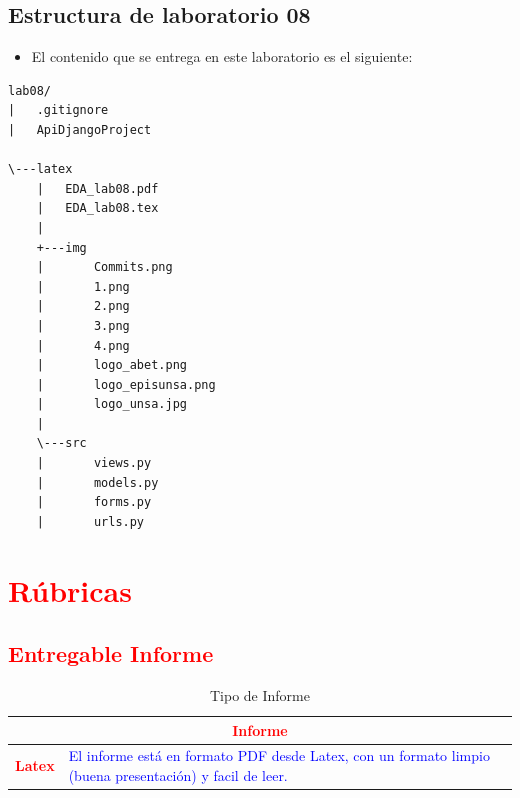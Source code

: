 \documentclass{article}
\begin{document}
	
		
	\subsection{Estructura de laboratorio 08}
	\begin{itemize}	
		\item El contenido que se entrega en este laboratorio es el siguiente:
	\end{itemize}
	
\begin{lstlisting}[style=ascii-tree]
lab08/
|   .gitignore
|	ApiDjangoProject

\---latex
    |	EDA_lab08.pdf
    |   EDA_lab08.tex
    |
    +---img
    |       Commits.png
    |       1.png
    |       2.png
    |       3.png
    |       4.png
    |       logo_abet.png
    |       logo_episunsa.png
    |       logo_unsa.jpg
    |
    \---src
	|		views.py
	|		models.py
	|		forms.py
	|		urls.py
\end{lstlisting}    


	\section{\textcolor{red}{Rúbricas}}
	
	\subsection{\textcolor{red}{Entregable Informe}}
	\begin{table}[H]
		\caption{Tipo de Informe}
		\setlength{\tabcolsep}{0.5em} %
		{\renewcommand{\arraystretch}{1.5}%
		
		\begin{tabular}{|p{3cm}|p{12cm}|}
			\hline
			\multicolumn{2}{|c|}{\textbf{\textcolor{red}{Informe}}}  \\
			\hline 
			\textbf{\textcolor{red}{Latex}} & \textcolor{blue}{El informe está en formato PDF desde Latex,  con un formato limpio (buena presentación) y facil de leer.}   \\ 
			\hline 
			
			
		\end{tabular}
	}
	\end{table}
\end{document}
